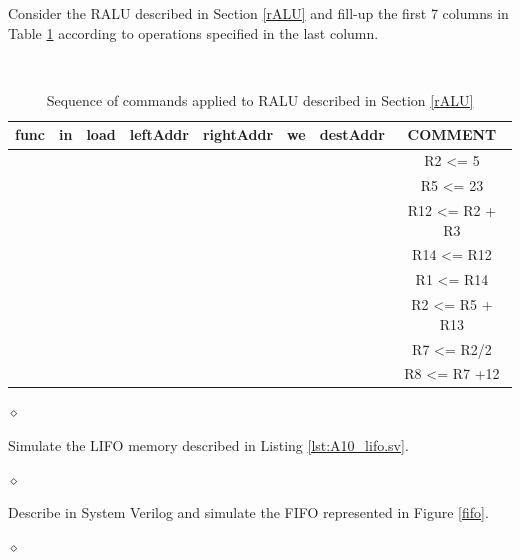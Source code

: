 \begin{problem}
Consider the RALU described in Section \ref{rALU} and fill-up the first 7 columns in Table \ref{aluSeq} according to operations specified in the last column.

\begin{table}[H]
  \begin{center}
    \caption{Sequence of commands applied to RALU described in Section \ref{rALU}}
    \label{aluSeq}
    \vspace{2mm}
    {\tt
    \begin{tabular}{|c|c|c|c|c|c|c||c|}
    \hline
    func &  in & load & leftAddr & rightAddr & we & destAddr & COMMENT          \\ \hline \hline
     &   &     &     &      &   &     & R2 <= 5         \\ \hline
     &   &     &     &      &   &     & R5 <= 23        \\ \hline
     &   &     &     &      &   &     & R12 <= R2 + R3 	\\ \hline
     &   &     &     &      &   &     & R14 <= R12      \\ \hline
     &   &     &     &      &   &     & R1 <= R14       \\ \hline
     &   &     &     &      &   &     & R2 <= R5 + R13  \\ \hline
     &   &     &     &      &   &     & R7 <= R2/2      \\ \hline
     &   &     &     &      &   &     & R8 <= R7 +12    \\ \hline
 \end{tabular}
 }
  \end{center}
\end{table}


$\diamond$
\end{problem}

\begin{problem}
Simulate the LIFO memory described in Listing \ref{lst:A10_lifo.sv}.

$\diamond$
\end{problem}

\begin{problem}

Describe in System Verilog and simulate the FIFO represented in Figure \ref{fifo}.

$\diamond$
\end{problem}

